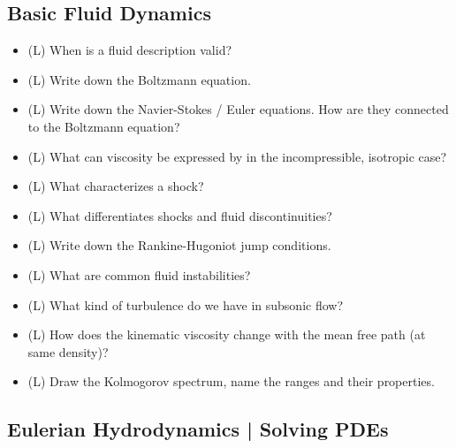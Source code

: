 \subsection*{Basic Fluid Dynamics}

\begin{itemize}
    \item (L) When is a fluid description valid?
    \item (L) Write down the Boltzmann equation.
    \item (L) Write down the Navier-Stokes / Euler equations. How are they connected to the Boltzmann equation?
    \item (L) What can viscosity be expressed by in the incompressible, isotropic case?
    \item (L) What characterizes a shock?
    \item (L) What differentiates shocks and fluid discontinuities?
    \item (L) Write down the Rankine-Hugoniot jump conditions.
    \item (L) What are common fluid instabilities?
    \item (L) What kind of turbulence do we have in subsonic flow?
    \item (L) How does the kinematic viscosity change with the mean free path (at same density)?
    \item (L) Draw the Kolmogorov spectrum, name the ranges and their properties.
\end{itemize}

\subsection*{Eulerian Hydrodynamics | Solving PDEs}

